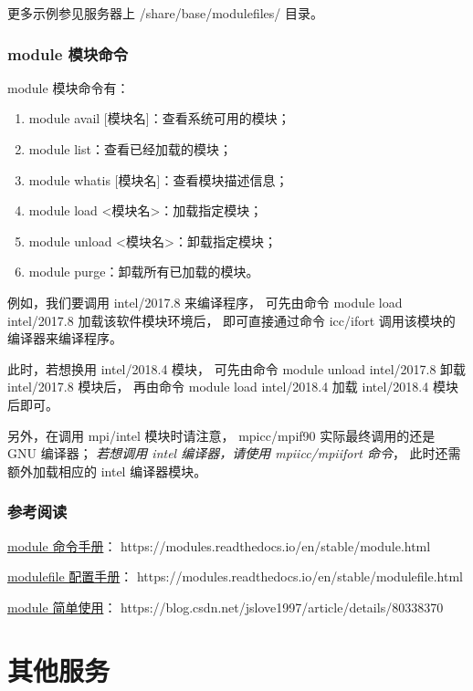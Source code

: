 \documentclass[UTF8]{ctexart}
\newcommand{\myem}[1]{{\color{red}\em #1}}
\newcommand{\mynote}[1]{\colorbox{gray!35}{#1}}
\newcommand{\mynnote}[1]{\colorbox{gray!15}{\color{blue!65}#1}}
\begin{document}
更多示例参见服务器上 /share/base/modulefiles/ 目录。

\subsubsection{module 模块命令}
module 模块命令有：
\begin{enumerate}[\hspace{15mm}（1）]
  \item \mynnote{module avail [模块名]}：查看系统可用的模块；
  \item \mynnote{module list}：查看已经加载的模块；
  \item \mynnote{module whatis [模块名]}：查看模块描述信息；
  \item \mynnote{module load <模块名>}：加载指定模块；
  \item \mynnote{module unload <模块名>}：卸载指定模块；
  \item \mynnote{module purge}：卸载所有已加载的模块。
\end{enumerate}

例如，我们要调用 intel/2017.8 来编译程序，
可先由命令 \mynote{module load intel/2017.8} 加载该软件模块环境后，
即可直接通过命令 icc/ifort 调用该模块的编译器来编译程序。

此时，若想换用 intel/2018.4 模块，
可先由命令 \mynote{module unload intel/2017.8} 卸载 intel/2017.8 模块后，
再由命令 \mynote{module load intel/2018.4} 加载 intel/2018.4 模块后即可。

另外，在调用 mpi/intel 模块时请注意，
mpicc/mpif90 实际最终调用的还是 GNU 编译器；
\myem{若想调用 intel 编译器，请使用 mpiicc/mpiifort 命令}，
此时还需额外加载相应的 intel 编译器模块。

\subsubsection{参考阅读}
\href{https://modules.readthedocs.io/en/stable/module.html}{module 命令手册}：
https://modules.readthedocs.io/en/stable/module.html

\href{https://modules.readthedocs.io/en/stable/modulefile.html}{modulefile 配置手册}：
https://modules.readthedocs.io/en/stable/modulefile.html

\href{https://blog.csdn.net/jslove1997/article/details/80338370}{module 简单使用}：
https://blog.csdn.net/jslove1997/article/details/80338370

\section{其他服务}
\end{document}
